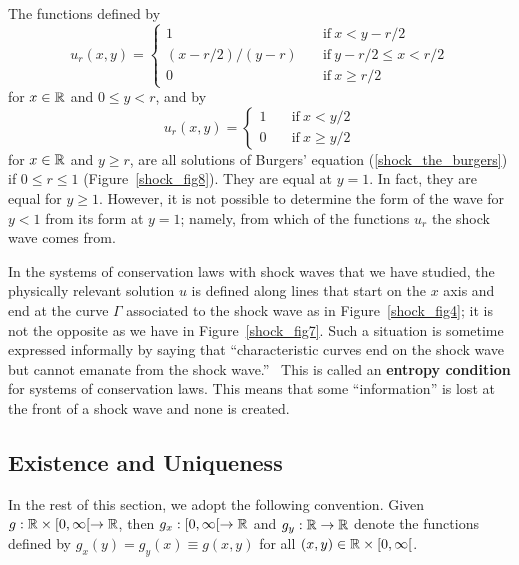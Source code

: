 \begin{egg}
The functions defined by
\[
u_r(x,y) =
\begin{cases}
1 & \quad \text{if} \ x < y - r/2 \\
(x-r/2)/(y-r) & \quad \text{if} \ y - r/2 \leq x < r/2 \\
0 & \quad \text{if} \ x \geq r/2
\end{cases}
\]
for $x \in \mathbb{R}$ and $0 \leq y < r$, and by
\[
u_r(x,y) =
\begin{cases}
1 & \quad \text{if} \ x < y/2 \\
0 & \quad \text{if} \ x \geq y/2
\end{cases}
\]
for $x \in \mathbb{R}$ and $y \geq r$, are all solutions of
Burgers' equation (\ref{shock_the_burgers}) if $0 \leq r \leq 1$
(Figure~\ref{shock_fig8}).  They are equal at $y = 1$.  In
fact, they are equal for $y \geq 1$.  However, it is not possible to
determine the form of the wave for $y <1$ from its form at $y=1$;
namely, from which of the functions $u_r$ the shock wave comes from.
\end{egg}


In the systems of conservation laws with shock waves that we have studied, the
physically relevant solution $u$ is defined along lines that start on
the $x$ axis and end at the curve $\Gamma$ associated to the shock wave
as in Figure~\ref{shock_fig4}; it is not the opposite as we have in
Figure~\ref{shock_fig7}.  Such a situation
is sometime expressed informally by saying that ``characteristic
curves end on the shock wave but cannot emanate from the shock
wave.'' \  This is called an {\bfseries entropy
condition} for
systems of conservation laws.  This means that some ``information'' is
lost at the front of a shock wave and none is created.

\subsection{Existence and Uniqueness}

In the rest of this section, we adopt the following convention.
Given $g:\mathbb{R} \times [0,\infty[ \to \mathbb{R}$, then $g_x:[0,\infty[ \to \mathbb{R}$
and $g_y:\mathbb{R} \to \mathbb{R}$ denote the functions defined by
$g_x(y) = g_y(x) \equiv g(x,y)$ for all $(x,y) \in \mathbb{R}\times [0,\infty[$.

